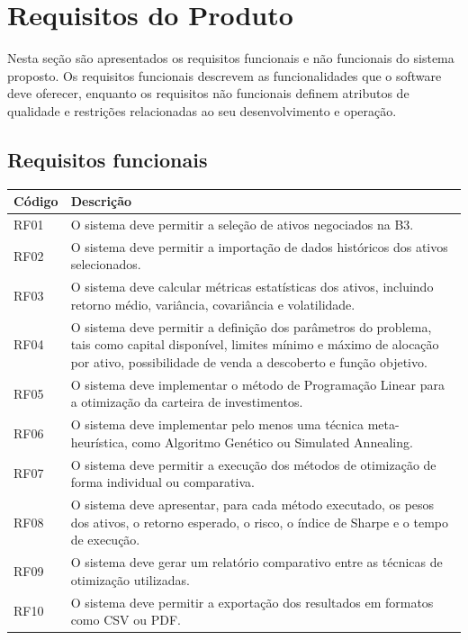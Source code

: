 \documentclass[
	12pt,				%
	openright,			%
	oneside,			    %
	a4paper,				%
	english,			%
	french,			%
	spanish,			%
	brazil			%
	]{abntex2}
\begin{document}
\chapter{Requisitos do Produto}
Nesta seção são apresentados os requisitos funcionais e não funcionais do sistema proposto. Os requisitos funcionais descrevem as funcionalidades que o software deve oferecer, enquanto os requisitos não funcionais definem atributos de qualidade e restrições relacionadas ao seu desenvolvimento e operação.
\section{Requisitos funcionais}

\begin{quadro}[htb]
\caption{Requisitos funcionais do sistema}
\label{qua:requisitos-funcionais}
\begin{tabularx}{\textwidth}{|p{2cm}|X|}
\hline
\textbf{Código} & \textbf{Descrição} \\ \hline
RF01 & O sistema deve permitir a seleção de ativos negociados na B3. \\ \hline
RF02 & O sistema deve permitir a importação de dados históricos dos ativos selecionados. \\ \hline
RF03 & O sistema deve calcular métricas estatísticas dos ativos, incluindo retorno médio, variância, covariância e volatilidade. \\ \hline
RF04 & O sistema deve permitir a definição dos parâmetros do problema, tais como capital disponível, limites mínimo e máximo de alocação por ativo, possibilidade de venda a descoberto e função objetivo. \\ \hline
RF05 & O sistema deve implementar o método de Programação Linear para a otimização da carteira de investimentos. \\ \hline
RF06 & O sistema deve implementar pelo menos uma técnica meta-heurística, como Algoritmo Genético ou Simulated Annealing. \\ \hline
RF07 & O sistema deve permitir a execução dos métodos de otimização de forma individual ou comparativa. \\ \hline
RF08 & O sistema deve apresentar, para cada método executado, os pesos dos ativos, o retorno esperado, o risco, o índice de Sharpe e o tempo de execução. \\ \hline
RF09 & O sistema deve gerar um relatório comparativo entre as técnicas de otimização utilizadas. \\ \hline
RF10 & O sistema deve permitir a exportação dos resultados em formatos como CSV ou PDF. \\ \hline
\end{tabularx}

\end{quadro}
\end{document}
